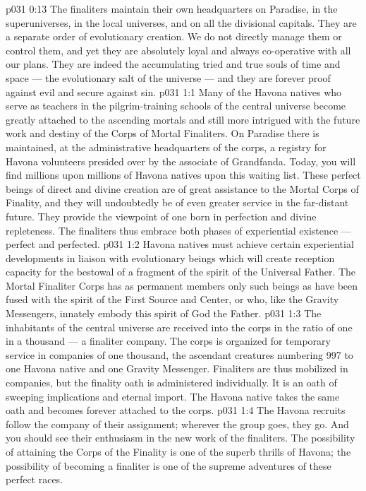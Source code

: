 \vs p031 0:13 The finaliters maintain their own headquarters on Paradise, in the superuniverses, in the local universes, and on all the divisional capitals. They are a separate order of evolutionary creation. We do not directly manage them or control them, and yet they are absolutely loyal and always co\hyp{}operative with all our plans. They are indeed the accumulating tried and true souls of time and space --- the evolutionary salt of the universe --- and they are forever proof against evil and secure against sin.
\vs p031 1:1 Many of the Havona natives who serve as teachers in the pilgrim\hyp{}training schools of the central universe become greatly attached to the ascending mortals and still more intrigued with the future work and destiny of the Corps of Mortal Finaliters. On Paradise there is maintained, at the administrative headquarters of the corps, a registry for Havona volunteers presided over by the associate of Grandfanda. Today, you will find millions upon millions of Havona natives upon this waiting list. These perfect beings of direct and divine creation are of great assistance to the Mortal Corps of Finality, and they will undoubtedly be of even greater service in the far\hyp{}distant future. They provide the viewpoint of one born in perfection and divine repleteness. The finaliters thus embrace both phases of experiential existence --- perfect and perfected.
\vs p031 1:2 Havona natives must achieve certain experiential developments in liaison with evolutionary beings which will create reception capacity for the bestowal of a fragment of the spirit of the Universal Father. The Mortal Finaliter Corps has as permanent members only such beings as have been fused with the spirit of the First Source and Center, or who, like the Gravity Messengers, innately embody this spirit of God the Father.
\vs p031 1:3 The inhabitants of the central universe are received into the corps in the ratio of one in a thousand --- a finaliter company. The corps is organized for temporary service in companies of one thousand, the ascendant creatures numbering 997 to one Havona native and one Gravity Messenger. Finaliters are thus mobilized in companies, but the finality oath is administered individually. It is an oath of sweeping implications and eternal import. The Havona native takes the same oath and becomes forever attached to the corps.
\vs p031 1:4 The Havona recruits follow the company of their assignment; wherever the group goes, they go. And you should see their enthusiasm in the new work of the finaliters. The possibility of attaining the Corps of the Finality is one of the superb thrills of Havona; the possibility of becoming a finaliter is one of the supreme adventures of these perfect races.
